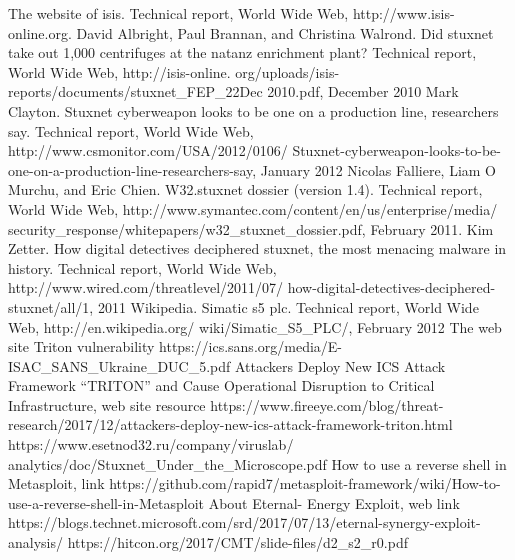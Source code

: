 \documentclass[conference]{IEEEtran}
\begin{document}
\begin{thebibliography}{1}
\bibitem{}
 The website of isis. Technical report, World Wide Web, http://www.isis-online.org.
\bibitem{}
David Albright, Paul Brannan, and Christina Walrond. Did stuxnet take out 1,000 centrifuges
at the natanz enrichment plant? Technical report, World Wide Web, http://isis-online.
org/uploads/isis-reports/documents/stuxnet\_FEP\_22Dec 2010.pdf, December 2010
\bibitem{}
Mark Clayton. Stuxnet cyberweapon looks to be one on a production line, researchers
say. Technical report, World Wide Web, http://www.csmonitor.com/USA/2012/0106/
Stuxnet-cyberweapon-looks-to-be-one-on-a-production-line-researchers-say,
January 2012
\bibitem{}
Nicolas Falliere, Liam O Murchu, and Eric Chien. W32.stuxnet dossier (version 1.4). Technical
report, World Wide Web, http://www.symantec.com/content/en/us/enterprise/media/
security\_response/whitepapers/w32\_stuxnet\_dossier.pdf, February 2011.
\bibitem{}
Kim Zetter. How digital detectives deciphered stuxnet, the most menacing malware in history.
Technical report, World Wide Web, http://www.wired.com/threatlevel/2011/07/
how-digital-detectives-deciphered-stuxnet/all/1, 2011
\bibitem{}
Wikipedia. Simatic s5 plc. Technical report, World Wide Web, http://en.wikipedia.org/
wiki/Simatic\_S5\_PLC/, February 2012
\bibitem{}
The web site Triton vulnerability https://ics.sans.org/media/E-ISAC\_SANS\_Ukraine\_DUC\_5.pdf
\bibitem{}
Attackers Deploy New ICS Attack Framework “TRITON” and Cause Operational Disruption to Critical Infrastructure, web site resource https://www.fireeye.com/blog/threat-research/2017/12/attackers-deploy-new-ics-attack-framework-triton.html
\bibitem{}
https://www.esetnod32.ru/company/viruslab/ analytics/doc/Stuxnet\_Under\_the\_Microscope.pdf
\bibitem{}
How to use a reverse shell in Metasploit, link 
https://github.com/rapid7/metasploit-framework/wiki/How-to-use-a-reverse-shell-in-Metasploit
\bibitem{} About Eternal- Energy Exploit, web link
https://blogs.technet.microsoft.com/srd/2017/07/13/eternal-synergy-exploit-analysis/
\bibitem{}
https://hitcon.org/2017/CMT/slide-files/d2\_s2\_r0.pdf
\end{thebibliography}

\end{document}
